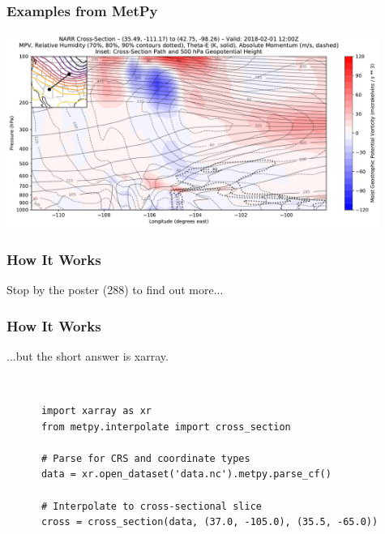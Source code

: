 \documentclass{beamer}
\begin{document}
\begin{frame}
    \frametitle{Examples from MetPy}
    \begin{center}
        \includegraphics[height=2.5in]{figures/csi_example_narr.pdf}
    \end{center}
\end{frame}

\begin{frame}
    \frametitle{How It Works}
    Stop by the poster (288) to find out more...
\end{frame}

\begin{frame}[fragile]
    \frametitle{How It Works}
    ...but the short answer is xarray.
    
    \ 
    
    \begin{verbatim}
      import xarray as xr
      from metpy.interpolate import cross_section

      # Parse for CRS and coordinate types
      data = xr.open_dataset('data.nc').metpy.parse_cf()

      # Interpolate to cross-sectional slice
      cross = cross_section(data, (37.0, -105.0), (35.5, -65.0))
    \end{verbatim}
\end{frame}
\end{document}
